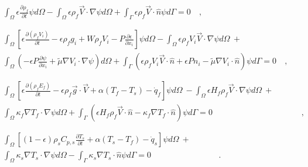 \begin{subequations}
\label{eq:PronghornEquations_V2WeakForm}
\begin{align}
\label{eq:MassWeak}
\begin{split}
\int_{\Omega}\epsilon\frac{\partial\rho_f}{\partial t}\psi d\Omega-\int_\Omega\epsilon\rho_f\vec{V}\cdot\nabla\psi d\Omega+\int_\Gamma\epsilon\rho_f\vec{V}\cdot\hat{n}\psi d\Gamma=0&\ ,\\
&\end{split}\\
%
%
\label{eq:MomWeak}
\begin{split}\int_\Omega\left\lbrack\epsilon\frac{\partial(\rho_fV_i)}{\partial t}-\epsilon\rho_f g_i+W\rho_fV_i-P\frac{\partial\epsilon}{\partial x_i}\right\rbrack\psi d\Omega -\int_\Omega \epsilon\rho_fV_i\vec{V}\cdot\nabla\psi d\Omega\ +\hspace{1cm}&\\
\int_\Omega \left(-\epsilon P\frac{\partial\psi}{\partial x_i}+\tilde{\mu}\nabla V_i\cdot\nabla\psi\right)d\Omega+\int_\Gamma\left(\epsilon\rho_fV_i\vec{V}\cdot\hat{n} + \epsilon Pn_i-\tilde{\mu}\nabla V_i\cdot\hat{n}\right)\psi d\Gamma=0&\ ,\\
&
\end{split}\\
%
%
\label{eq:EnergyWeak}
\begin{split}
\int_\Omega\left\lbrack\epsilon\frac{\partial(\rho_fE_f)}{\partial t}-\epsilon\rho_f\vec{g}\cdot\vec{V}+\alpha(T_f-T_s)-\dot{q}_f\right\rbrack\psi d\Omega\ -\int_\Omega \epsilon H_f\rho_f\vec{V}\cdot\nabla\psi d\Omega\ +\hspace{1cm}&\\
\int_\Omega\kappa_f\nabla T_f\cdot\nabla\psi d\Omega+\int_\Gamma\left(\epsilon H_f\rho_f\vec{V}\cdot\hat{n}-\kappa_f\nabla T_f\cdot\hat{n}\right)\psi d\Gamma=0&\ ,\\
&
\end{split}\\
%
%
\begin{split}\int_\Omega\left\lbrack(1-\epsilon)\rho_sC_{p,s}\frac{\partial T_s}{\partial t}+\alpha(T_s-T_f)-\dot{q}_s\right\rbrack\psi d\Omega\ +\hspace{1cm}\\
\int_\Omega\kappa_s\nabla T_s\cdot\nabla\psi d\Omega-\int_\Gamma\kappa_s\nabla T_s\cdot\hat{n}\psi d\Gamma=0&\ .\end{split}
\end{align}
\end{subequations}

